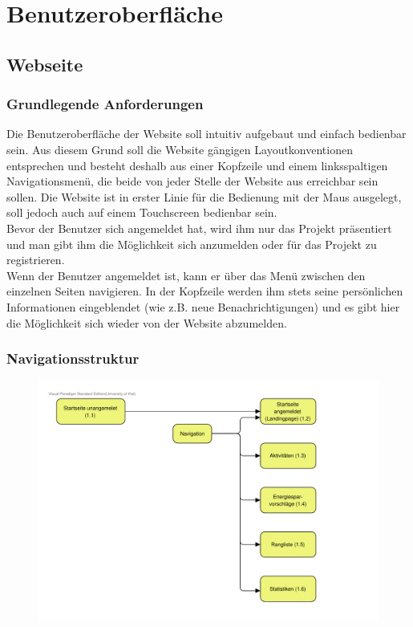 \documentclass[10pt,a4paper]{article}
\begin{document}




\section{Benutzeroberfl\"ache}
\subsection{Webseite}
\subsubsection{Grundlegende Anforderungen}
Die Benutzeroberfläche der Website soll intuitiv aufgebaut und einfach bedienbar sein. Aus diesem Grund soll die Website gängigen Layoutkonventionen entsprechen und besteht deshalb aus einer Kopfzeile und einem linksspaltigen Navigationsmenü, die beide von jeder Stelle der Website aus erreichbar sein sollen. Die Website ist in erster Linie für die Bedienung mit der Maus ausgelegt, soll jedoch auch auf einem Touchscreen bedienbar sein.\\
Bevor der Benutzer sich angemeldet hat, wird ihm nur das Projekt präsentiert und man gibt ihm die Möglichkeit sich anzumelden oder für das Projekt zu registrieren. \\
Wenn der Benutzer angemeldet ist, kann er über das Menü zwischen den einzelnen Seiten navigieren. In der Kopfzeile werden ihm stets seine persönlichen Informationen eingeblendet (wie z.B. neue Benachrichtigungen) und es gibt hier die Möglichkeit sich wieder von der Website abzumelden.
\subsubsection{Navigationsstruktur}
\begin{figure}[h!]
	\includegraphics[width=\linewidth]{gfx/guinavigation/GUI-Navigation-Website.pdf}
\end{figure}
\end{document}

